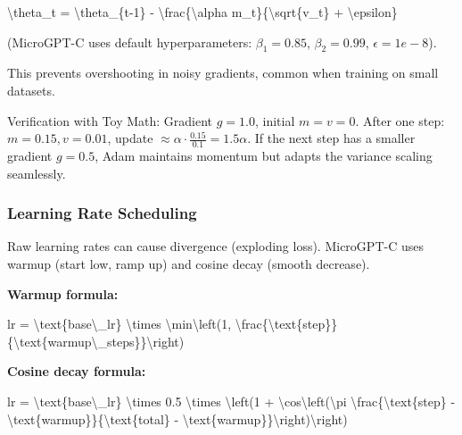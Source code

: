 \documentclass[
]{article}
\newenvironment{Shaded}{}{}
\newcommand{\NormalTok}[1]{#1}
\begin{document}
\begin{Shaded}
\begin{Highlighting}[]
\NormalTok{   \textbackslash{}theta\_t = \textbackslash{}theta\_\{t{-}1\} {-} \textbackslash{}frac\{\textbackslash{}alpha m\_t\}\{\textbackslash{}sqrt\{v\_t\} + \textbackslash{}epsilon\}}
\end{Highlighting}
\end{Shaded}

(MicroGPT-C uses default hyperparameters: \(\beta_1=0.85\),
\(\beta_2=0.99\), \(\epsilon=1e-8\)).

This prevents overshooting in noisy gradients, common when training on
small datasets.

Verification with Toy Math: Gradient \(g=1.0\), initial \(m=v=0\). After
one step: \(m=0.15, v=0.01\), update
\(\approx \alpha \cdot \frac{0.15}{0.1} = 1.5 \alpha\). If the next step
has a smaller gradient \(g=0.5\), Adam maintains momentum but adapts the
variance scaling seamlessly.

\subsubsection{Learning Rate Scheduling}\label{learning-rate-scheduling}

Raw learning rates can cause divergence (exploding loss). MicroGPT-C
uses warmup (start low, ramp up) and cosine decay (smooth decrease).

\textbf{Warmup formula:}

\begin{Shaded}
\begin{Highlighting}[]
\NormalTok{lr = \textbackslash{}text\{base\textbackslash{}\_lr\} \textbackslash{}times \textbackslash{}min\textbackslash{}left(1, \textbackslash{}frac\{\textbackslash{}text\{step\}\}\{\textbackslash{}text\{warmup\textbackslash{}\_steps\}\}\textbackslash{}right)}
\end{Highlighting}
\end{Shaded}

\textbf{Cosine decay formula:}

\begin{Shaded}
\begin{Highlighting}[]
\NormalTok{lr = \textbackslash{}text\{base\textbackslash{}\_lr\} \textbackslash{}times 0.5 \textbackslash{}times \textbackslash{}left(1 + \textbackslash{}cos\textbackslash{}left(\textbackslash{}pi \textbackslash{}frac\{\textbackslash{}text\{step\} {-} \textbackslash{}text\{warmup\}\}\{\textbackslash{}text\{total\} {-} \textbackslash{}text\{warmup\}\}\textbackslash{}right)\textbackslash{}right)}
\end{Highlighting}
\end{Shaded}
\end{document}
